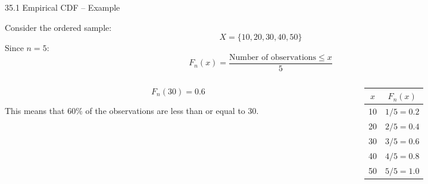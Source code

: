 
\begin{frame}{35.1 Empirical CDF -- Example}

Consider the ordered sample:
\[
X=\{10,20,30,40,50\}
\]
Since $n=5$:
\[
F_n(x)
=
\frac{\text{Number of observations}\leq x}{5}
\]

\begin{columns}[T]

\begin{column}{0.48\textwidth}

\[
F_n(30)=0.6
\]

This means that $60\%$ of the observations
are less than or equal to $30$.

\end{column}

\begin{column}{0.48\textwidth}

\begin{table}
\centering
\small

\begin{tabular}{c c}
\toprule
$x$ & $F_n(x)$ \\
\midrule
10 & $1/5=0.2$ \\
20 & $2/5=0.4$ \\
30 & $3/5=0.6$ \\
40 & $4/5=0.8$ \\
50 & $5/5=1.0$ \\
\bottomrule
\end{tabular}

\end{table}

\end{column}

\end{columns}

\end{frame}



